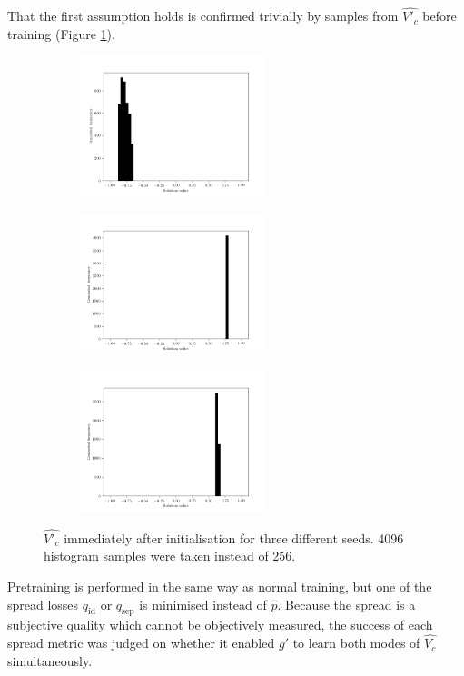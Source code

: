 \documentclass[../../main.tex]{subfiles}
\begin{document}
That the first assumption holds is confirmed trivially by samples from $\hat{V'_c}$ before training (Figure \ref{fig:initialisedGenerator}).
\begin{figure}[H]
    \centering
    \begin{subfigure}[a]{1.\textwidth}
        \centering
        \includegraphics[width=0.6\textwidth]{initialisedGenerator1}
    \end{subfigure}
    \begin{subfigure}[a]{1.\textwidth}
        \centering
        \includegraphics[width=0.6\textwidth]{initialisedGenerator2}
    \end{subfigure}
    \begin{subfigure}[a]{1.\textwidth}
        \centering
        \includegraphics[width=0.6\textwidth]{initialisedGenerator3}
    \end{subfigure}
    \caption{
        $\hat{V'_c}$ immediately after initialisation for three different seeds.
        4096 histogram samples were taken instead of 256.
    }
\label{fig:initialisedGenerator}
\end{figure}
Pretraining is performed in the same way as normal training, but one of the spread losses $q_\text{id}$ or $q_\text{sep}$ is minimised instead of $\hat{p}$.
Because the spread is a subjective quality which cannot be objectively measured, the success of each spread metric was judged on whether it enabled $g'$ to learn both modes of $\hat{V_c}$ simultaneously.
\end{document}
